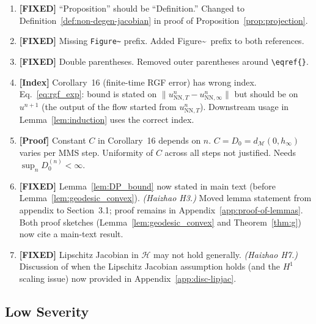 \documentclass[twoside,11pt]{article}
\newcommand{\NN}{\mathrm{NN}}
\newcommand{\calH}{\mathcal{H}}
\newcommand{\calM}{\mathcal{M}}
\begin{document}
\begin{enumerate}
\item {\color{green!50!black}\textbf{[FIXED]} ``Proposition'' should be ``Definition.''}
    Changed to Definition~\ref{def:non-degen-jacobian} in proof of Proposition~\ref{prop:projection}.

\item {\color{green!50!black}\textbf{[FIXED]} Missing \texttt{Figure\textasciitilde} prefix.}
    Added Figure\textasciitilde\ prefix to both references.

\item {\color{green!50!black}\textbf{[FIXED]} Double parentheses.}
    Removed outer parentheses around \verb|\eqref{}|.

\item {\color{red}\textbf{[Index]} Corollary~16 (finite-time RGF error) has wrong index.}
    Eq.~\eqref{eq:rgf_exp}: bound is stated on $\|u^n_{\NN,T}-u^n_{\NN,\infty}\|$
    but should be on $u^{n+1}$ (the output of the flow started from $u^n_{\NN,T}$).
    Downstream usage in Lemma~\ref{lem:induction} uses the correct index.

\item {\color{red}\textbf{[Proof]} Constant $C$ in Corollary~16 depends on $n$.}
    $C=D_0=d_\calM(0,h_\infty)$ varies per MMS step. Uniformity of $C$
    across all steps not justified. Needs $\sup_n D_0^{(n)}<\infty$.

\item {\color{green!50!black}\textbf{[FIXED]} Lemma~\ref{lem:DP_bound} now stated in main text (before Lemma~\ref{lem:geodesic_convex}).}
    \emph{(Haizhao H3.)}
    Moved lemma statement from appendix to Section~3.1; proof remains in
    Appendix~\ref{app:proof-of-lemmas}. Both proof sketches (Lemma~\ref{lem:geodesic_convex}
    and Theorem~\ref{thm:g}) now cite a main-text result.

\item {\color{green!50!black}\textbf{[FIXED]} Lipschitz Jacobian in $\calH$ may not hold generally.}
    \emph{(Haizhao H7.)}
    Discussion of when the Lipschitz Jacobian assumption holds (and the $H^1$ scaling
    issue) now provided in Appendix~\ref{app:disc-lipjac}.
\end{enumerate}

\subsection*{Low Severity}
\end{document}
